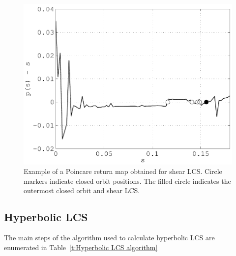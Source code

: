 \documentclass{article}
\begin{document}
\begin{figure}
\begin{center}
\includegraphics[width=\textwidth]{graphics/double_gyre/poincare_return_map}
\end{center}
\caption{Example of a Poincare return map obtained for shear LCS. Circle markers indicate closed orbit positions. The filled circle indicates the outermost closed orbit and shear LCS.}
\label{f:Poincare return map}
\end{figure}

\subsection{Hyperbolic LCS}

The main steps of the algorithm used to calculate hyperbolic LCS are enumerated in Table~\ref{t:Hyperbolic LCS algorithm}
\end{document}
